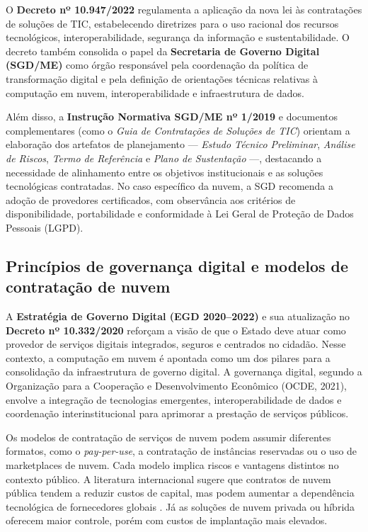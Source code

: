 \documentclass[a4paper, 12pt,brazil]{article}
\begin{document}
O \textbf{Decreto nº 10.947/2022} regulamenta a aplicação da nova lei às contratações de soluções de TIC, estabelecendo diretrizes para o uso racional dos recursos tecnológicos, interoperabilidade, segurança da informação e sustentabilidade. O decreto também consolida o papel da \textbf{Secretaria de Governo Digital (SGD/ME)} como órgão responsável pela coordenação da política de transformação digital e pela definição de orientações técnicas relativas à computação em nuvem, interoperabilidade e infraestrutura de dados.

Além disso, a \textbf{Instrução Normativa SGD/ME nº 1/2019} e documentos complementares (como o \textit{Guia de Contratações de Soluções de TIC}) orientam a elaboração dos artefatos de planejamento — \textit{Estudo Técnico Preliminar}, \textit{Análise de Riscos}, \textit{Termo de Referência} e \textit{Plano de Sustentação} —, destacando a necessidade de alinhamento entre os objetivos institucionais e as soluções tecnológicas contratadas. No caso específico da nuvem, a SGD recomenda a adoção de provedores certificados, com observância aos critérios de disponibilidade, portabilidade e conformidade à Lei Geral de Proteção de Dados Pessoais (LGPD).

\subsection{Princípios de governança digital e modelos de contratação de nuvem}

A \textbf{Estratégia de Governo Digital (EGD 2020–2022)} e sua atualização no \textbf{Decreto nº 10.332/2020} reforçam a visão de que o Estado deve atuar como provedor de serviços digitais integrados, seguros e centrados no cidadão. Nesse contexto, a computação em nuvem é apontada como um dos pilares para a consolidação da infraestrutura de governo digital. A governança digital, segundo a Organização para a Cooperação e Desenvolvimento Econômico (OCDE, 2021), envolve a integração de tecnologias emergentes, interoperabilidade de dados e coordenação interinstitucional para aprimorar a prestação de serviços públicos.

Os modelos de contratação de serviços de nuvem podem assumir diferentes formatos, como o \textit{pay-per-use}, a contratação de instâncias reservadas ou o uso de marketplaces de nuvem. Cada modelo implica riscos e vantagens distintos no contexto público. A literatura internacional sugere que contratos de nuvem pública tendem a reduzir custos de capital, mas podem aumentar a dependência tecnológica de fornecedores globais \cite{armbrust2020}. Já as soluções de nuvem privada ou híbrida oferecem maior controle, porém com custos de implantação mais elevados.
\end{document}
